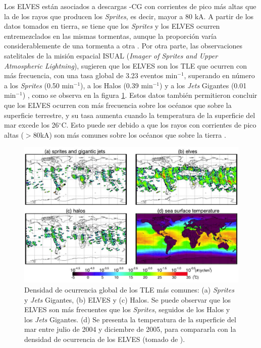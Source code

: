 \documentclass[11pt,oneside,openany,letter]{book}
\begin{document}
Los ELVES están asociados a descargas -CG con corrientes de pico más altas que la de los rayos que producen los \textit{Sprites}, es decir, mayor a 80 kA. A partir de los datos tomados en tierra, se tiene que los \textit{Sprites} y los ELVES ocurren entremezclados en las mismas tormentas, aunque la proporción varía considerablemente de una tormenta a otra \cite{FullekrugEtal2006}. Por otra parte, las observaciones satelitales de la misi\'on espacial ISUAL (\textit{Imager of Sprites and Upper Atmospheric Lightning}), sugieren que los ELVES son los TLE que ocurren con m\'as frecuencia, con una tasa global de 3.23 eventos min$^{-1}$, superando en número a los \textit{Sprites} (0.50 min$^{-1}$), a los Halos (0.39 min$^{-1}$) y a los \textit{Jets} Gigantes (0.01 min$^{-1}$) \cite{chen2008}, como se observa en la figura \ref{fig:TLE_global_rate}. Estos datos también permitieron concluir que los ELVES ocurren con más frecuencia sobre los océanos que sobre la superficie terrestre, y su tasa aumenta cuando la temperatura de la superficie del mar excede los 26$^{\circ}$C. Esto puede ser debido a que los rayos con corrientes de pico altas ($>80$kA) son más comunes sobre los océanos que sobre la tierra \cite{chen2008}. 

\begin{figure}
    \centering
    \includegraphics[scale=0.33]{figures/TLE_global_rate.png}
    \caption[Densidad de ocurrencia global de los TLE m\'as comunes]{Densidad de ocurrencia global de los TLE m\'as comunes: (a) \textit{Sprites} y \textit{Jets} Gigantes, (b) ELVES y (c) Halos. Se puede observar que los ELVES son m\'as frecuentes que los \textit{Sprites}, seguidos de los Halos y los \textit{Jets} Gigantes. (d) Se presenta la temperatura de la superficie del mar entre julio de 2004 y diciembre de 2005, para compararla con la densidad de ocurrencia de los ELVES (tomado de \cite{chen2008}).}
    \label{fig:TLE_global_rate}
\end{figure}
\end{document}
